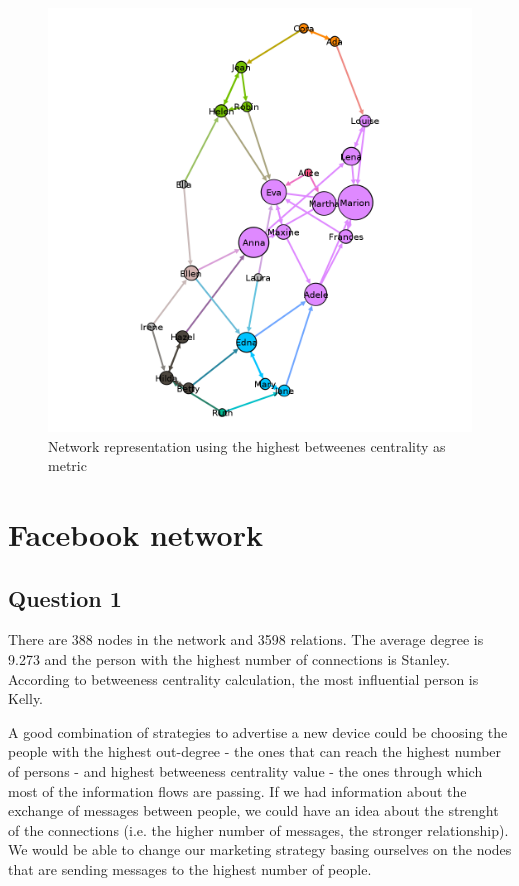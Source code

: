 \documentclass[a4paper]{article}
\begin{document}
\begin{figure}[!htpb]
\centering
\includegraphics[width=\textwidth]{res/img/network_output}
\caption{Network representation using the highest betweenes centrality as metric}
\label{fig:network_output}
\end{figure}

\section{Facebook network}

\subsection{Question 1}

There are 388 nodes in the network and 3598 relations. The average degree is 9.273 and the person with the highest number of connections is Stanley. According to betweeness centrality calculation, the most influential person is Kelly. 

A good combination of strategies to advertise a new device could be choosing the people with the highest out-degree - the ones that can reach the highest number of persons - and highest betweeness centrality value - the ones through which most of the information flows are passing. If we had information about the exchange of messages between people, we could have an idea about the strenght of the connections (i.e. the higher number of messages, the stronger relationship). We would be able to change our marketing strategy basing ourselves on the nodes that are sending messages to the highest number of people.
\end{document}
